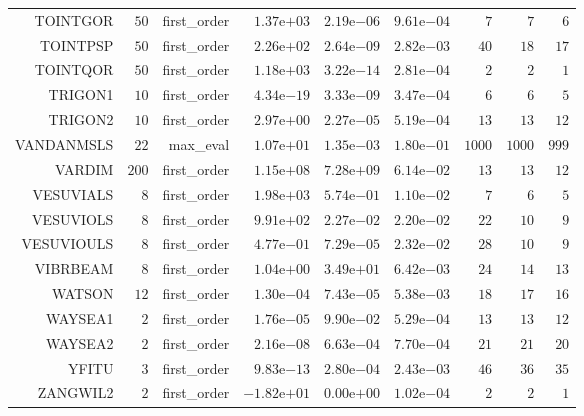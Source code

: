 \begin{longtable}{rrrrrrrrr}
TOINTGOR & \(    50\) & first\_order & \( 1.37\)e\(+03\) & \( 2.19\)e\(-06\) & \( 9.61\)e\(-04\) & \(     7\) & \(     7\) & \(     6\) \\
TOINTPSP & \(    50\) & first\_order & \( 2.26\)e\(+02\) & \( 2.64\)e\(-09\) & \( 2.82\)e\(-03\) & \(    40\) & \(    18\) & \(    17\) \\
TOINTQOR & \(    50\) & first\_order & \( 1.18\)e\(+03\) & \( 3.22\)e\(-14\) & \( 2.81\)e\(-04\) & \(     2\) & \(     2\) & \(     1\) \\
TRIGON1 & \(    10\) & first\_order & \( 4.34\)e\(-19\) & \( 3.33\)e\(-09\) & \( 3.47\)e\(-04\) & \(     6\) & \(     6\) & \(     5\) \\
TRIGON2 & \(    10\) & first\_order & \( 2.97\)e\(+00\) & \( 2.27\)e\(-05\) & \( 5.19\)e\(-04\) & \(    13\) & \(    13\) & \(    12\) \\
VANDANMSLS & \(    22\) & max\_eval & \( 1.07\)e\(+01\) & \( 1.35\)e\(-03\) & \( 1.80\)e\(-01\) & \(  1000\) & \(  1000\) & \(   999\) \\
VARDIM & \(   200\) & first\_order & \( 1.15\)e\(+08\) & \( 7.28\)e\(+09\) & \( 6.14\)e\(-02\) & \(    13\) & \(    13\) & \(    12\) \\
VESUVIALS & \(     8\) & first\_order & \( 1.98\)e\(+03\) & \( 5.74\)e\(-01\) & \( 1.10\)e\(-02\) & \(     7\) & \(     6\) & \(     5\) \\
VESUVIOLS & \(     8\) & first\_order & \( 9.91\)e\(+02\) & \( 2.27\)e\(-02\) & \( 2.20\)e\(-02\) & \(    22\) & \(    10\) & \(     9\) \\
VESUVIOULS & \(     8\) & first\_order & \( 4.77\)e\(-01\) & \( 7.29\)e\(-05\) & \( 2.32\)e\(-02\) & \(    28\) & \(    10\) & \(     9\) \\
VIBRBEAM & \(     8\) & first\_order & \( 1.04\)e\(+00\) & \( 3.49\)e\(+01\) & \( 6.42\)e\(-03\) & \(    24\) & \(    14\) & \(    13\) \\
WATSON & \(    12\) & first\_order & \( 1.30\)e\(-04\) & \( 7.43\)e\(-05\) & \( 5.38\)e\(-03\) & \(    18\) & \(    17\) & \(    16\) \\
WAYSEA1 & \(     2\) & first\_order & \( 1.76\)e\(-05\) & \( 9.90\)e\(-02\) & \( 5.29\)e\(-04\) & \(    13\) & \(    13\) & \(    12\) \\
WAYSEA2 & \(     2\) & first\_order & \( 2.16\)e\(-08\) & \( 6.63\)e\(-04\) & \( 7.70\)e\(-04\) & \(    21\) & \(    21\) & \(    20\) \\
YFITU & \(     3\) & first\_order & \( 9.83\)e\(-13\) & \( 2.80\)e\(-04\) & \( 2.43\)e\(-03\) & \(    46\) & \(    36\) & \(    35\) \\
ZANGWIL2 & \(     2\) & first\_order & \(-1.82\)e\(+01\) & \( 0.00\)e\(+00\) & \( 1.02\)e\(-04\) & \(     2\) & \(     2\) & \(     1\) \\\hline
\end{longtable}
